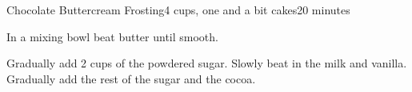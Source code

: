 \documentclass[../Cookbook.tex]{subfiles}
\begin{document}
\begin{recipe}[buttercream]{Chocolate Buttercream Frosting}{4 cups, one and a bit cakes}{20 minutes}

	In a mixing bowl beat butter until smooth.

	Gradually add 2 cups of the powdered sugar. Slowly beat in the milk and vanilla. Gradually add the rest of the sugar and the cocoa.


\end{recipe}
\end{document}
